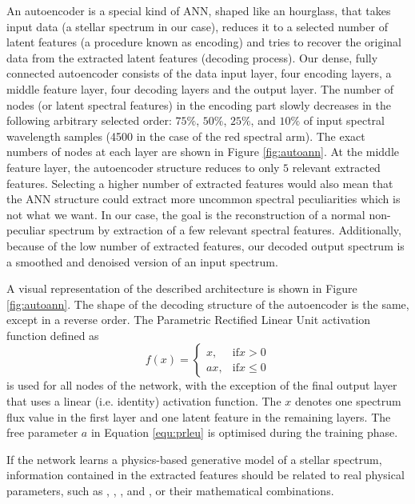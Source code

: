 An autoencoder is a special kind of ANN, shaped like an hourglass, that takes input data (a stellar spectrum in our case), reduces it to a selected number of latent features (a procedure known as encoding) and tries to recover the original data from the extracted latent features (decoding process). Our dense, fully connected autoencoder consists of the data input layer, four encoding layers, a middle feature layer, four decoding layers and the output layer. The number of nodes (or latent spectral features) in the encoding part slowly decreases in the following arbitrary selected order: $75\%$, $50\%$, $25\%$, and $10\%$ of input spectral wavelength samples (4500 in the case of the red spectral arm). The exact numbers of nodes at each layer are shown in Figure \ref{fig:autoann}. At the middle feature layer, the autoencoder structure reduces to only $5$ relevant extracted features. Selecting a higher number of extracted features would also mean that the ANN structure could extract more uncommon spectral peculiarities which is not what we want. In our case, the goal is the reconstruction of a normal non-peculiar spectrum by extraction of a few relevant spectral features. Additionally, because of the low number of extracted features, our decoded output spectrum is a smoothed and denoised version of an input spectrum.

A visual representation of the described architecture is shown in Figure \ref{fig:autoann}. The shape of the decoding structure of the autoencoder is the same, except in a reverse order. The Parametric Rectified Linear Unit \citep[PReLU,][]{2015arXiv150201852H} activation function defined as
\begin{equation}
f(x) = \begin{cases}
x, & \mathrm{if} x > 0 \\
ax, & \mathrm{if} x \le 0
\end{cases}
\label{equ:prleu}
\end{equation}
is used for all nodes of the network, with the exception of the final output layer that uses a linear (i.e. identity) activation function. The $x$ denotes one spectrum flux value in the first layer and one latent feature in the remaining layers. The free parameter $a$ in Equation \ref{equ:prleu} is optimised during the training phase.

If the network learns a physics-based generative model of a stellar spectrum, information contained in the extracted features should be related to real physical parameters, such as \Teff, \Logg, \Feh, and \vsin, or their mathematical combinations. 

